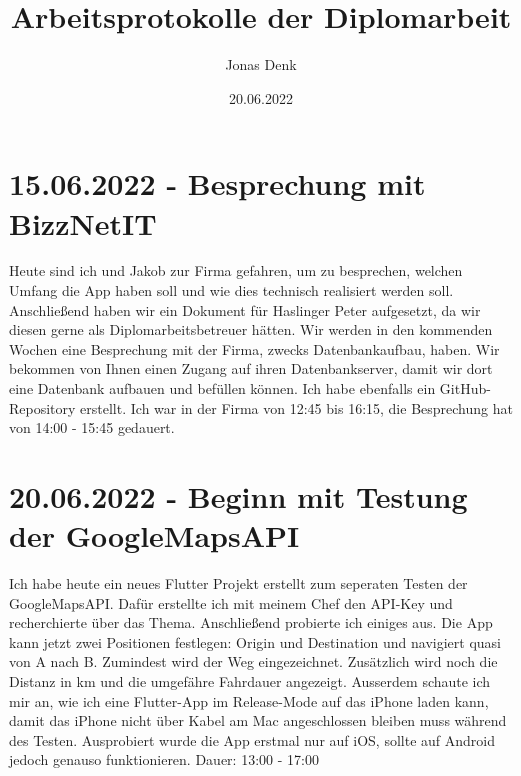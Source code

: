 \documentclass[letterpaper,10pt]{article}
\title{Arbeitsprotokolle der Diplomarbeit}
\date{20.06.2022}
\author{Jonas Denk}
\begin{document}
\maketitle
\frenchspacing
\raggedbottom
\pagestyle{plain}
\section{15.06.2022 - Besprechung mit BizzNetIT}
Heute sind ich und Jakob zur Firma gefahren, um zu besprechen, welchen Umfang die App haben soll und wie dies technisch realisiert werden soll. Anschließend haben wir ein Dokument für Haslinger Peter aufgesetzt, da wir diesen gerne als Diplomarbeitsbetreuer hätten. Wir werden in den kommenden Wochen eine Besprechung mit der Firma, zwecks Datenbankaufbau, haben. Wir bekommen von Ihnen einen Zugang auf ihren Datenbankserver, damit wir dort eine Datenbank aufbauen und befüllen können. Ich habe ebenfalls ein GitHub-Repository erstellt. Ich war in der Firma von 12:45 bis 16:15, die Besprechung hat von 14:00 - 15:45 gedauert.
\section{20.06.2022 - Beginn mit Testung der GoogleMapsAPI}
Ich habe heute ein neues Flutter Projekt erstellt zum seperaten Testen der GoogleMapsAPI. Dafür erstellte ich mit meinem Chef den API-Key und recherchierte über das Thema. Anschließend probierte ich einiges aus. Die App kann jetzt zwei Positionen festlegen: Origin und Destination und navigiert quasi von A nach B. Zumindest wird der Weg eingezeichnet. Zusätzlich wird noch die Distanz in km und die umgefähre Fahrdauer angezeigt. Ausserdem schaute ich mir an, wie ich eine Flutter-App im Release-Mode auf das iPhone laden kann, damit das iPhone nicht über Kabel am Mac angeschlossen bleiben muss während des Testen. Ausprobiert wurde die App erstmal nur auf iOS, sollte auf Android jedoch genauso funktionieren. Dauer: 13:00 - 17:00
\printbibliography
\end{document}
